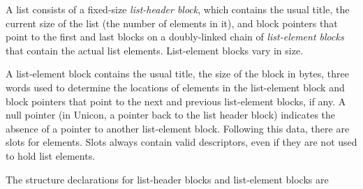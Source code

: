 A list consists of a fixed-size \textit{list-header block}, which
contains the usual title, the current size of the list (the number of
elements in it), and block pointers that point to the first and last
blocks on a doubly-linked chain of \textit{list-element blocks} that
contain the actual list elements. List-element blocks vary in size.


A list-element block contains the usual title, the size of the block
in bytes, three words used to determine the locations of elements in
the list-element block and block pointers that point to the next and
previous list-element blocks, if any. A null pointer
\textcolor[rgb]{0.0,0.2784314,1.0}{(in Unicon, a pointer back to the
list header block)} indicates the absence of a pointer to another
list-element block. Following this data, there are slots for
elements. Slots always contain valid descriptors, even if they are not
used to hold list elements.


The structure declarations for list-header blocks and list-element blocks are


